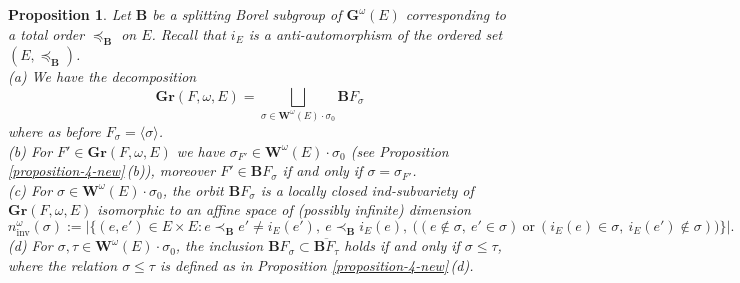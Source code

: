 \documentclass[12pt]{amsart}
\newtheorem{proposition}{Proposition}
\theoremstyle{definition}
\begin{document}
\begin{proposition}
Let $\mathbf{B}$ be a splitting Borel subgroup of $\mathbf{G}^\omega(E)$ corresponding to a total order $\preceq_\mathbf{B}$ on $E$. Recall that $i_E$ is a anti-automorphism of the ordered set $(E,\preceq_\mathbf{B})$. \\
{\rm (a)} We have the decomposition
\[\mathbf{Gr}(F,\omega,E)=\bigsqcup_{\sigma\in\mathbf{W}^\omega(E)\cdot\sigma_0}\mathbf{B}F_\sigma\]
where as before $F_\sigma=\langle\sigma\rangle$. \\
{\rm (b)} For $F'\in\mathbf{Gr}(F,\omega,E)$ we have $\sigma_{F'}\in\mathbf{W}^\omega(E)\cdot\sigma_0$ (see Proposition \ref{proposition-4-new}\,{\rm (b)}), moreover $F'\in\mathbf{B}F_\sigma$ if and only if $\sigma=\sigma_{F'}$. \\
{\rm (c)} For $\sigma\in\mathbf{W}^\omega(E)\cdot\sigma_0$, the orbit $\mathbf{B}F_\sigma$ is a locally closed ind-subvariety of $\mathbf{Gr}(F,\omega,E)$ isomorphic to an affine space of (possibly infinite) dimension
\[n_\mathrm{inv}^\omega(\sigma):=|\{(e,e')\in E\times E:e\prec_\mathbf{B}e'\not=i_E(e'),\ e\prec_\mathbf{B}i_E(e),\ \big((e\notin\sigma,\ e'\in\sigma)\ \mathrm{or}\ (i_E(e)\in\sigma,\ i_E(e')\notin\sigma)\big)\}|.\]
{\rm (d)} For  $\sigma,\tau\in\mathbf{W}^\omega(E)\cdot\sigma_0$,
the inclusion $\mathbf{B}F_\sigma\subset\overline{\mathbf{B}F_\tau}$ holds if and only if $\sigma\leq\tau$, where the relation $\sigma\leq\tau$ is defined as in Proposition \ref{proposition-4-new}\,{\rm (d)}.
\end{proposition}
\end{document}
